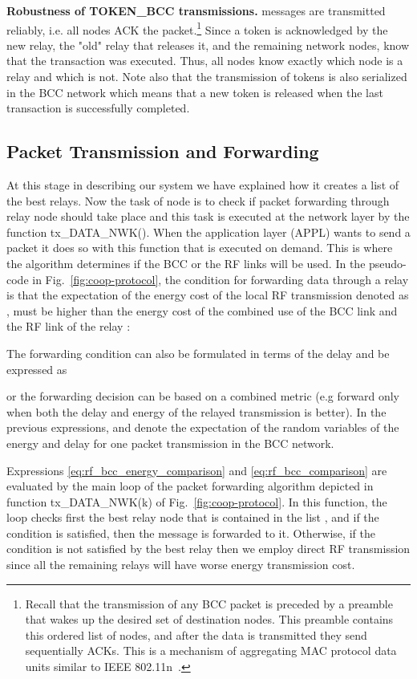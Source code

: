\documentclass[10pt]{IEEEtran}
\newcounter{section:outage-analysis}
\begin{document}
\textbf{Robustness of TOKEN\_BCC transmissions.}
\label{subsection:4}
 messages are transmitted reliably, i.e. all nodes ACK the packet.\footnote{Recall that the transmission of any BCC packet is preceded by a preamble that wakes up the desired set of destination nodes. This preamble contains this ordered list of nodes, and after the data is transmitted they send sequentially ACKs. This is a mechanism of aggregating MAC protocol data units similar to IEEE 802.11n~\cite{IEEE-80211n}.} Since a token is acknowledged by the new relay, the "old" relay that releases it, and the remaining network nodes, know that the transaction was executed. Thus, all nodes know exactly which node is a relay and which is not. Note also that the transmission of tokens is also serialized in the BCC network which means that a new token is released when the last transaction is successfully completed.

\subsection{Packet Transmission and Forwarding}
\label{subsection:4}
At this stage in describing our system we have explained how it creates a list of the best relays. Now the task of node  is to check if packet forwarding through relay node  should take place and this task is executed at the network layer by the function tx\_DATA\_NWK(). When the application layer (APPL) wants to send a packet it does so with this function that is executed on demand. This is where the algorithm determines if the BCC or the RF links will be used. In the pseudo-code in Fig.~\ref{fig:coop-protocol}, the condition for forwarding data through a relay  is that the expectation of the energy cost of the local RF transmission denoted as , must be higher than the energy cost of the combined use of the BCC link and the RF link of the relay :

The forwarding condition can also be formulated in terms of the delay and be expressed as

or the forwarding decision can be based on a combined metric (e.g forward only when both the delay and energy of the relayed transmission is better). In the previous expressions,  and  denote the expectation of the random variables of the energy and delay for one packet transmission in the BCC network.

Expressions \eqref{eq:rf_bcc_energy_comparison} and \eqref{eq:rf_bcc_comparison} are evaluated by the main loop of the packet forwarding algorithm depicted in function tx\_DATA\_NWK(k) of Fig.~\ref{fig:coop-protocol}. In this function, the loop checks first the best relay node that is contained in the list , and if the condition is satisfied, then the message is forwarded to it. Otherwise, if the condition is not satisfied by the best relay then we employ direct RF transmission since all the remaining relays will have worse energy transmission cost.
\end{document}
